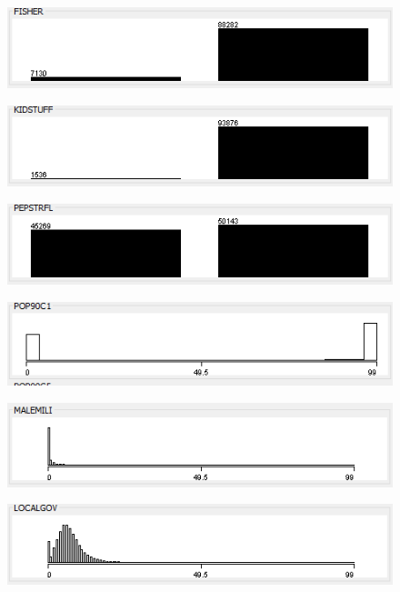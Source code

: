 \begin{figure}
\includegraphics{./images/expl_rep/Cattura2-02-06}
\end{figure}
\begin{figure}
\includegraphics{./images/expl_rep/Cattura2-02-07}
\end{figure}
\begin{figure}
\includegraphics{./images/expl_rep/Cattura2-02-08}
\end{figure}
\begin{figure}
\includegraphics{./images/expl_rep/Cattura2-02-09}
\end{figure}
\begin{figure}
\includegraphics{./images/expl_rep/Cattura2-03-00}
\end{figure}
\begin{figure}
\includegraphics{./images/expl_rep/Cattura2-03-01}
\end{figure}

